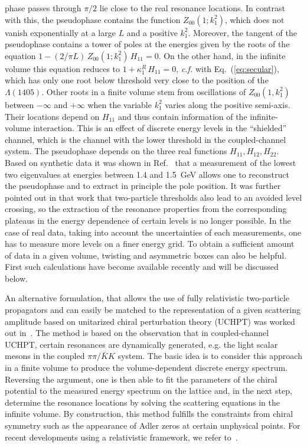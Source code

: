 phase passes through $\pi/2$ lie close to the real resonance locations.
In contrast with this, the pseudophase contains the function
$Z_{00}(1;k_1^2)$, which does not vanish exponentially at
a large $L$ and a positive $k_1^2$.
Moreover, 
the tangent of the pseudophase contains a tower of poles
at the energies given by the roots of the equation
$1-({2}/{\pi L})\,Z_{00}(1;k_1^2)\,H_{11}=0$. On the other hand,
in the infinite volume
this equation reduces to $1+\kappa_1^R\,H_{11}=0$, {\sl c.f.} with
Eq.~(\ref{eq:secular}), which has only one root below threshold very close to
the position of the $\Lambda(1405)$. Other roots in a finite volume 
stem from oscillations of $Z_{00}(1,k_1^2)$ 
between $-\infty$ and $+\infty$ when the variable $k_1^2$ varies 
along the positive semi-axis. {Their locations depend on $H_{11}$ and thus
contain information of the infinite-volume interaction}.
This is an effect of discrete energy levels in the ``shielded'' channel, {which is the channel with the lower
threshold in the coupled-channel system}.
The pseudophase depends on the three real functions $H_{11},H_{12},H_{22}$. Based on 
synthetic data it was shown in 
Ref.~\cite{Lage:2009zv} that a measurement of the lowest two eigenvalues
at energies between 1.4 and 1.5~GeV allows one to reconstruct the
pseudophase and to extract in principle the pole position. It was further
pointed out in that work that two-particle
thresholds also lead to an avoided level crossing, so the extraction
of the resonance properties from the corresponding plateaus in the
energy dependence of certain levels is no longer possible.
In the case of real data, taking into account the
uncertainties of each measurements, one has to measure more levels
on a finer energy grid. To obtain a sufficient amount of data in a
given volume, twisting and asymmetric boxes can also be helpful.
First such {calculations} have become available
recently and will be discussed below.

An alternative formulation, that allows the use of  fully relativistic
two-particle propagators and can easily be matched to the representation
of a given scattering amplitude based on unitarized chiral perturbation
theory (UCHPT) was worked out in~\cite{Doring:2011vk}. 
The method is based on the observation that
in coupled-channel UCHPT, certain
resonances are dynamically generated, e.g. the light scalar mesons in the
coupled $\pi\pi/\bar KK$ system. The basic idea is to
consider this approach  in a finite volume to
produce the volume-dependent discrete energy spectrum.
Reversing the argument, one is then able to fit the parameters of the
chiral potential to the measured energy spectrum on the
lattice and, in the next step, determine the resonance locations
by solving the scattering equations in the infinite
volume. By construction, this method fulfills the constraints from
chiral symmetry such as the appearance of Adler zeros at certain
unphysical points.
%
For recent developments using a relativistic framework, we refer
to~\cite{Briceno:2015csa,Briceno:2015dca,Briceno:2015tza}.

